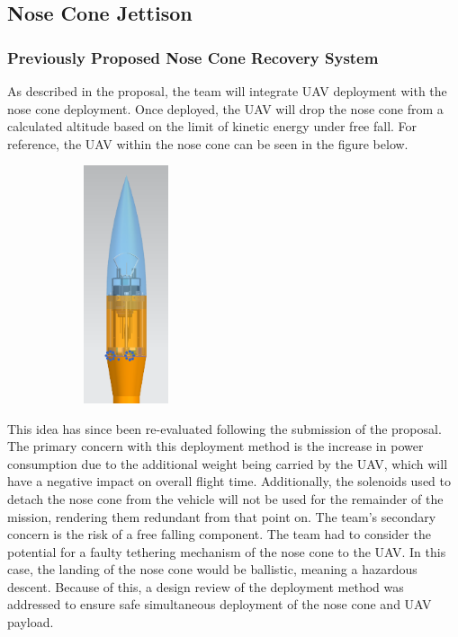 \begin{table}[H]
{\begin{tabularx}{\linewidth}{XXXlXl}
    \bottomrule
    \end{tabularx}
    }
\end{table}
	

	\subsection{Nose Cone Jettison}
		\subsubsection{Previously Proposed Nose Cone Recovery System}
            As described in the proposal, the team will integrate UAV deployment with the nose cone deployment. Once deployed, the UAV will drop the nose cone from a calculated altitude based on the limit of kinetic energy under free fall. For reference, the UAV within the nose cone can be seen in the figure below.

            \includegraphics[width = 7cm, height = 7cm]{img/PL/jet.PNG}
        
            This idea has since been re-evaluated following the submission of the proposal. The primary concern with this deployment method is the increase in power consumption due to the additional weight being carried by the UAV, which will have a negative impact on overall flight time. Additionally, the solenoids used to detach the nose cone from the vehicle will not be used for the remainder of the mission, rendering them redundant from that point on. The team’s secondary concern is the risk of a free falling component. The team had to consider the potential for a faulty tethering mechanism of the nose cone to the UAV. In this case, the landing of the nose cone would be ballistic, meaning a hazardous descent. Because of this, a design review of the deployment method was addressed to ensure safe simultaneous deployment of the nose cone and UAV payload. 

